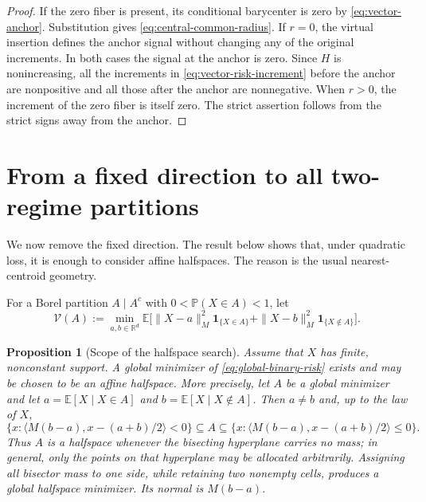\documentclass[a4paper]{amsart}
\numberwithin{equation}{section}
\newtheorem{proposition}[theorem]{Proposition}
\theoremstyle{remark}
\newcommand{\1}{\mathbf 1}
\begin{document}
\begin{proof}
If the zero fiber is present, its conditional barycenter is zero by
\eqref{eq:vector-anchor}.  Substitution gives
\eqref{eq:central-common-radius}.  If $r=0$, the virtual insertion defines the
anchor signal without changing any of the original increments.  In both
cases the signal at the anchor is zero.  Since $H$ is nonincreasing, all the
increments in \eqref{eq:vector-risk-increment} before the anchor are
nonpositive and all those after the anchor are nonnegative.  When $r>0$, the
increment of the zero fiber is itself zero.  The strict assertion follows
from the strict signs away from the anchor.
\end{proof}


\section{From a fixed direction to all two-regime partitions}
\label{sec:global-halfspace}

We now remove the fixed direction.  The result below shows that, under
quadratic loss, it is enough to consider affine halfspaces.  The reason is the
usual nearest-centroid geometry.

For a Borel partition $A\mid A^c$ with $0<\mathbb P(X\in A)<1$, let
\begin{equation}\label{eq:global-binary-risk}
  \mathcal V(A):=\min_{a,b\in\mathbb R^d}
  \mathbb E\bigl[
     \|X-a\|_M^2\mathbf 1_{\{X\in A\}}
    +\|X-b\|_M^2\mathbf 1_{\{X\notin A\}}
  \bigr].
\end{equation}

\begin{proposition}[Scope of the halfspace search]
\label{prop:global-halfspace}
Assume that $X$ has finite, nonconstant support.  A global minimizer of
\eqref{eq:global-binary-risk} exists and may be chosen to be an affine
halfspace.  More precisely, let $A$ be a global minimizer and let
$a=\mathbb E[X\mid X\in A]$ and $b=\mathbb E[X\mid X\notin A]$.  Then
$a\neq b$ and, up to the law of $X$,
\begin{equation}\label{eq:nearest-centroid-sandwich}
 \bigl\{x:\langle M(b-a),x-(a+b)/2\rangle<0\bigr\}
 \subseteq A\subseteq
 \bigl\{x:\langle M(b-a),x-(a+b)/2\rangle\leq0\bigr\}.
\end{equation}
Thus $A$ is a halfspace whenever the bisecting hyperplane carries no
mass; in general, only the points on that hyperplane may be allocated
arbitrarily.  Assigning all bisector mass to one side, while retaining two
nonempty cells, produces a global halfspace minimizer.  Its normal is
$M(b-a)$.
\end{proposition}
\end{document}
